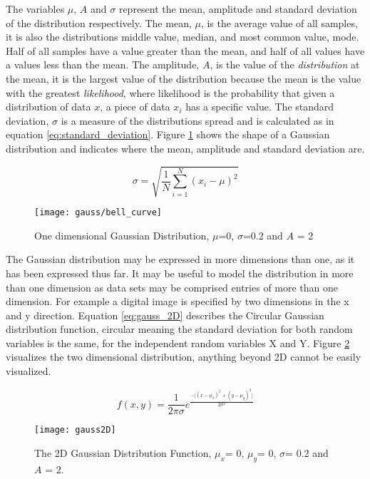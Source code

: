 The variables $\mu$, $A$ and $\sigma$ represent the mean, amplitude and standard deviation of the distribution respectively. The mean, $\mu$, is the average value of all samples, it is also the distributions middle value, median, and most common value, mode. Half of all samples have a value greater than the mean, and half of all values have a values less than the mean. The amplitude, $A$, is the value of the \emph{distribution} at the mean, it is the largest value of the distribution because the mean is the value with the greatest \emph{likelihood}, where likelihood is the probability that given a distribution of data $x$, a piece of data $x_i$ has a specific value. The standard deviation, $\sigma$ is a measure of the distributions spread and is calculated as in equation \ref{eq:standard_deviation}. Figure \ref{fig:gauss} shows the shape of a Gaussian distribution and indicates where the mean, amplitude and standard deviation are.

\begin{equation}
  \sigma = \sqrt{\frac{1}{N}\sum_{i=1}^{N}(x_i - \mu)^2}
  \label{eq:standard_deviation}
\end{equation}

\begin{figure}[H]
  \centering
  \centering\texttt{[image: gauss/bell\_curve]}
  \caption{One dimensional Gaussian Distribution, $\mu$=0, $\sigma$=0.2 and $A$ = 2}
  \label{fig:gauss}
\end{figure}

The Gaussian distribution may be expressed in more dimensions than one, as it has been expressed thus far. It may be useful to model the distribution in more than one dimension as data sets may be comprised entries of more than one dimension. For example a digital image is specified by two dimensions in the x and y direction. Equation \ref{eq:gauss_2D} describes the Circular Gaussian distribution function, circular meaning the standard deviation for both random variables is the same, for the independent random variables X and Y. Figure \ref{fig:gauss_2D} visualizes the two dimensional distribution, anything beyond 2D cannot be easily visualized. 

\begin{equation}
f(x,y) = \frac{1}{2\pi\sigma}e^\frac{{-\big[(x-\mu_x)^2 + (y-\mu_y)^2\big]}}{2\sigma^2}
\label{eq:gauss_2D}
\end{equation}

\begin{figure}[H]
  \centering
  \centering\texttt{[image: gauss2D]}
  \caption{The 2D Gaussian Distribution Function, $\mu_x$= 0, $\mu_y$= 0, $\sigma$= 0.2 and $A$ = 2.}
  \label{fig:gauss_2D}
\end{figure}







  
  
